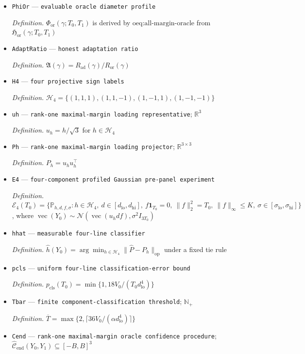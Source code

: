 \documentclass{article}
\begin{document}
\begin{itemize}
  \item \texttt{PhiOr} --- \texttt{evaluable oracle diameter profile}
  \par\smallskip\noindent\emph{Definition.} \(\Phi_{\mathrm{or}}(\gamma;T_0,T_1)\) is derived by \(\text{oeq:all-margin-oracle}\) from \(\mathfrak H_{\mathrm{or}}(\gamma;T_0,T_1)\)
  \item \texttt{AdaptRatio} --- \texttt{honest adaptation ratio}
  \par\smallskip\noindent\emph{Definition.} \(\mathfrak A(\gamma)=R_{\mathrm{ad}}(\gamma)/R_{\mathrm{or}}(\gamma)\)
  \item \texttt{H4} --- \texttt{four projective sign labels}
  \par\smallskip\noindent\emph{Definition.} \(\mathcal H_4=\{(1,1,1),(1,1,-1),(1,-1,1),(1,-1,-1)\}\)
  \item \texttt{uh} --- \texttt{rank-\allowbreak{}one maximal-\allowbreak{}margin loading representative}; \(\mathbb R^3\)
  \par\smallskip\noindent\emph{Definition.} \(u_h=h/\sqrt 3\) for \(h\in\mathcal H_4\)
  \item \texttt{Ph} --- \texttt{rank-\allowbreak{}one maximal-\allowbreak{}margin loading projector}; \(\mathbb R^{3\times3}\)
  \par\smallskip\noindent\emph{Definition.} \(P_h=u_hu_h^{\top}\)
  \item \texttt{E4} --- \texttt{four-\allowbreak{}component profiled Gaussian pre-\allowbreak{}panel experiment}
  \par\smallskip\noindent\emph{Definition.} \(\mathcal E_4(T_0)=\{\mathbb P_{h,d,f,\sigma}:h\in\mathcal H_4,\ d\in[d_{\mathrm{lo}},d_{\mathrm{hi}}],\ f\mathbf 1_{T_0}=0,\ \lVert f\rVert_2^2=T_0,\ \lVert f\rVert_\infty\le K,\ \sigma\in[\sigma_{\mathrm{lo}},\sigma_{\mathrm{hi}}]\}\), where \(\operatorname{vec}(Y_0)\sim\mathcal N(\operatorname{vec}(u_hdf),\sigma^2I_{3T_0})\)
  \item \texttt{hhat} --- \texttt{measurable four-\allowbreak{}line classifier}
  \par\smallskip\noindent\emph{Definition.} \(\widehat h(Y_0)=\arg\min_{h\in\mathcal H_4}\|\widehat P-P_h\|_{\mathrm{op}}\) under a fixed tie rule
  \item \texttt{pcls} --- \texttt{uniform four-\allowbreak{}line classification-\allowbreak{}error bound}
  \par\smallskip\noindent\emph{Definition.} \(p_{\mathrm{cls}}(T_0)=\min\{1,18V_0/(T_0d_{\mathrm{lo}}^4)\}\)
  \item \texttt{Tbar} --- \texttt{finite component-\allowbreak{}classification threshold}; \(\mathbb N_{+}\)
  \par\smallskip\noindent\emph{Definition.} \(\overline T=\max\{2,\lceil36V_0/(\alpha d_{\mathrm{lo}}^4)\rceil\}\)
  \item \texttt{Cend} --- \texttt{rank-\allowbreak{}one maximal-\allowbreak{}margin oracle confidence procedure}; \(\widehat{\mathcal C}_{\mathrm{end}}(Y_0,Y_1)\subseteq[-B,B]^3\)
\end{itemize}
\end{document}
